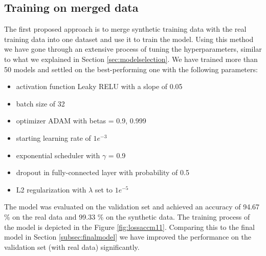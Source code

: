 \subsection{Training on merged data} \label{subsec:mergedmodel} 

The first proposed approach is to merge synthetic training data with the real training data into one dataset and use it to train the model. Using this method we have gone through an extensive process of tuning the hyperparameters, similar to what we explained in Section \ref{sec:modelselection}. We have trained more than 50 models and settled on the best-performing one with the following parameters: 

\begin{itemize}
    \setlength\itemsep{1px}
    \item activation function Leaky RELU with a slope of 0.05
    \item batch size of 32
    \item optimizer ADAM with betas = 0.9, 0.999
    \item starting learning rate of $1e^{-3}$
    \item exponential scheduler with $\gamma$ = 0.9
    \item dropout in fully-connected layer with probability of 0.5
    \item L2 regularization with $\lambda$ set to $1e^{-5}$
\end{itemize}

The model was evaluated on the validation set and achieved an accuracy of 94.67 \% on the real data and 99.33 \% on the synthetic data. The training process of the model is depicted in the Figure \ref{fig:lossaccm11}. Comparing this to the final model in Section \ref{subsec:finalmodel} we have improved the performance on the validation set (with real data) significantly. 


